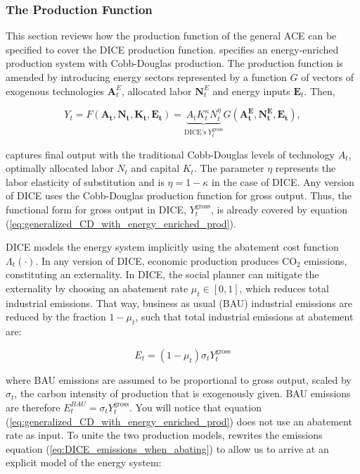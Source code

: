 \subsubsection{The Production Function}

This section reviews how the production function of the general ACE can be specified to cover the DICE production function. \textcite{traeger2021analytic_discussion} specifies an energy-enriched production system with Cobb-Douglas production. The production function is amended by introducing energy sectors represented by a function \(G\) of vectors of exogenous technologies \(\bm{A}_t^E\), allocated labor \(\bm{N}_t^E\) and energy inputs \(\bm{E}_t\). Then,

\begin{equation}
    Y_t = F(\bm{A_t}, \bm{N_t}, \bm{K_t}, \bm{E_t}) 
    = \underbrace{A_t K_t^\kappa N_t^\eta}_{\text{DICE's}\; Y_t^{\text{gross}}} G(\bm{A_t^E}, \bm{N_t^E}, \bm{E_t}) ,
\label{eq:generalized_CD_with_energy_enriched_prod}
\end{equation}

captures final output with the traditional Cobb-Douglas levels of technology \(A_t\), optimally allocated labor \(N_t\) and capital \(K_t\). The parameter \(\eta\) represents the labor elasticity of substitution and is \(\eta=1-\kappa\) in the case of DICE. Any version of DICE uses the Cobb-Douglas production function for gross output. Thus, the functional form for gross output in DICE, \(Y_t^{\text{gross}}\), is already covered by equation (\ref{eq:generalized_CD_with_energy_enriched_prod}). 

DICE models the energy system implicitly using the abatement cost function \(\Lambda_t(\cdot)\). In any version of DICE, economic production produces CO$_{2}$ emissions, constituting an externality. In DICE, the social planner can mitigate the externality by choosing an abatement rate \(\mu_t \in [0,1]\), which reduces total industrial emissions. That way, business as usual (BAU) industrial emissions are reduced by the fraction \(1-\mu_t\), such that total industrial emissions at abatement are:

\begin{equation}
    E_t = (1-\mu_t) \sigma_t Y_t^{\text{gross}}
\label{eq:DICE_emissions_when_abating}
\end{equation}

where BAU emissions are assumed to be proportional to gross output, scaled by \(\sigma_t\), the carbon intensity of production that is exogenously given. BAU emissions are therefore \(E_t^{BAU} = \sigma_t Y_t^{\text{gross}}\). You will notice that equation (\ref{eq:generalized_CD_with_energy_enriched_prod}) does not use an abatement rate as input. To unite the two production models, \textcite{traeger2021analytic_discussion} rewrites the emissions equation (\ref{eq:DICE_emissions_when_abating}) to allow us to arrive at an explicit model of the energy system:


